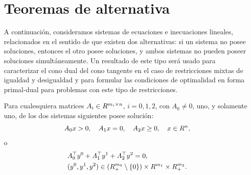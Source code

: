 
\section{Teoremas de alternativa}
\label{v1:sec:3.3}

A continuación, consideramos sistemas de ecuaciones e inecuaciones lineales, relacionados en el sentido de que existen dos alternativas: si un sistema no posee soluciones, entonces el otro posee soluciones, y ambos sistemas no pueden poseer soluciones simultáneamente. Un resultado de este tipo será usado para caracterizar el cono dual del cono tangente en el caso de restricciones mixtas de igualdad y desigualdad y para formular las condiciones de optimalidad en forma primal-dual para problemas con este tipo de restricciones.

\begin{theorem}\label{v1:thm:3.3.1}
 Para cualesquiera matrices $A_i \in R^{m_i \times n}$, $i = 0, 1, 2$, con $A_0 \neq 0$, uno, y solamente uno, de los dos sistemas siguientes posee solución:
 \begin{equation}
 A_0 x > 0, \quad A_1 x = 0, \quad A_2 x \ge 0, \quad x \in R^n, \label{v1:eq:3.9}
 \end{equation}
 o
 \begin{equation}
 \begin{aligned}
 & A_0^\top y^0 + A_1^\top y^1 + A_2^\top y^2 = 0, \\
 & (y^0, y^1, y^2) \in (R^{m_0}_+ \setminus \{0\}) \times R^{m_1} \times R^{m_2}_+.
 \end{aligned} \label{v1:eq:3.10}
 \end{equation}
\end{theorem}

